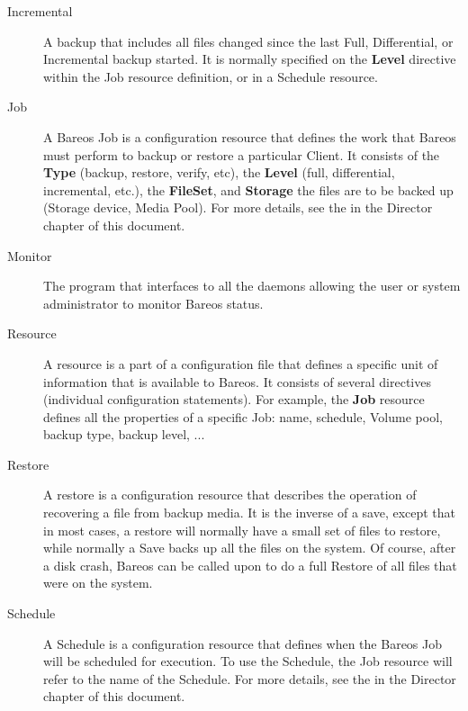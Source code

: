 \begin{description}
\item [Incremental]
   A backup that includes all files changed since the  last Full, Differential,
   or Incremental backup started. It is normally  specified on the {\bf Level}
   directive within the Job resource  definition, or in a Schedule resource.

\label{JobDef}
\item [Job]
   A Bareos Job is a configuration resource that defines the work that
   Bareos must perform to backup or restore a particular Client.  It
   consists of the {\bf Type} (backup, restore, verify, etc), the {\bf
   Level} (full, differential, incremental, etc.), 
   the {\bf FileSet}, and {\bf Storage} the
   files are to be backed up (Storage device, Media Pool).  For more
   details, see the  in the
   Director chapter of this document.

\item [Monitor]
   The program that interfaces to all the daemons  allowing the user or
   system administrator to monitor Bareos status.

\item [Resource]
   A resource is a part of a configuration file that defines a specific
   unit of information that is available to Bareos.  It consists of several
   directives (individual configuration statements).  For example, the {\bf
   Job} resource defines all the properties of a specific Job: name,
   schedule, Volume pool, backup type, backup level, ...

\item [Restore]
   A restore is a configuration resource that describes the operation of
   recovering a file from backup media.  It is the inverse of a save,
   except that in most cases, a restore will normally have a small set of
   files to restore, while normally a Save backs up all the files on the
   system.  Of course, after a disk crash, Bareos can be called upon to do
   a full Restore of all files that were on the system.

\item [Schedule]
   A Schedule is a configuration resource that defines when the Bareos Job
   will be scheduled for execution.  To use the Schedule, the Job resource
   will refer to the name of the Schedule.  For more details, see the
    in the Director
   chapter of this document.


\end{description}
